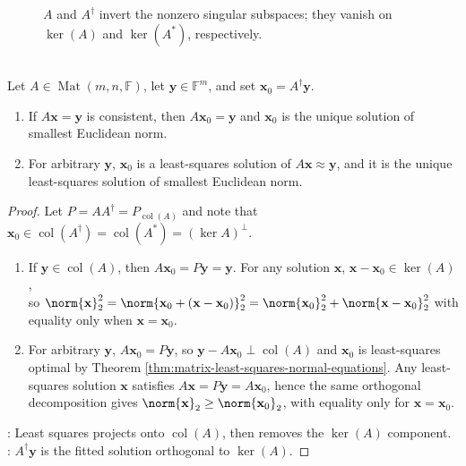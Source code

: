 \begin{figure}[H]
  \centering
  
  \caption{$A$ and $A^{\dagger}$ invert the nonzero singular subspaces; they vanish on $\ker(A)$ and $\ker(A^*)$, respectively.}
  \label{fig:pseudoinverse-four-spaces}
\end{figure}

\begin{theorem} \label{thm:pseudoinverse-minimum-norm-least-squares} \\
Let $A\in\operatorname{Mat}(m,n,\mathbb{F})$, let $\mathbf{y}\in\mathbb{F}^m$, and set $\mathbf{x}_0=A^{\dagger}\mathbf{y}$.
\begin{enumerate}[label=(\roman*)]
\setlength{\itemsep}{0pt}
\item If $A\mathbf{x}=\mathbf{y}$ is consistent, then $A\mathbf{x}_0=\mathbf{y}$ and $\mathbf{x}_0$ is the unique solution of smallest Euclidean norm.
\item For arbitrary $\mathbf{y}$, $\mathbf{x}_0$ is a least-squares solution of $A\mathbf{x}\approx\mathbf{y}$, and it is the unique least-squares solution of smallest Euclidean norm.
\end{enumerate}
\begin{proof}
Let $P=AA^{\dagger}=P_{\operatorname{col}(A)}$ and note that $\mathbf{x}_0\in\operatorname{col}(A^{\dagger})=\operatorname{col}(A^*)=(\ker A)^{\perp}$.
\begin{enumerate}[label=(\roman*)]
\setlength{\itemsep}{0pt}
\item If $\mathbf{y}\in\operatorname{col}(A)$, then $A\mathbf{x}_0=P\mathbf{y}=\mathbf{y}$. For any solution $\mathbf{x}$, $\mathbf{x}-\mathbf{x}_0\in\ker(A)$,\\
so $\norm{\mathbf{x}}_2^2 =\norm{\mathbf{x}_0+(\mathbf{x}-\mathbf{x}_0)}_2^2 =\norm{\mathbf{x}_0}_2^2+\norm{\mathbf{x}-\mathbf{x}_0}_2^2$ with equality only when $\mathbf{x}=\mathbf{x}_0$.
\item For arbitrary $\mathbf{y}$, $A\mathbf{x}_0=P\mathbf{y}$, so $\mathbf{y}-A\mathbf{x}_0\perp\operatorname{col}(A)$ and $\mathbf{x}_0$ is least-squares optimal by Theorem \ref{thm:matrix-least-squares-normal-equations}. Any least-squares solution $\mathbf{x}$ satisfies $A\mathbf{x}=P\mathbf{y}=A\mathbf{x}_0$, hence the same orthogonal decomposition gives $\norm{\mathbf{x}}_2\geq\norm{\mathbf{x}_0}_2$, with equality only for $\mathbf{x}=\mathbf{x}_0$.
\end{enumerate}
: Least squares projects onto $\operatorname{col}(A)$, then removes the $\ker(A)$ component.\\
: $A^{\dagger}\mathbf{y}$ is the fitted solution orthogonal to $\ker(A)$.
\end{proof}
\end{theorem}

